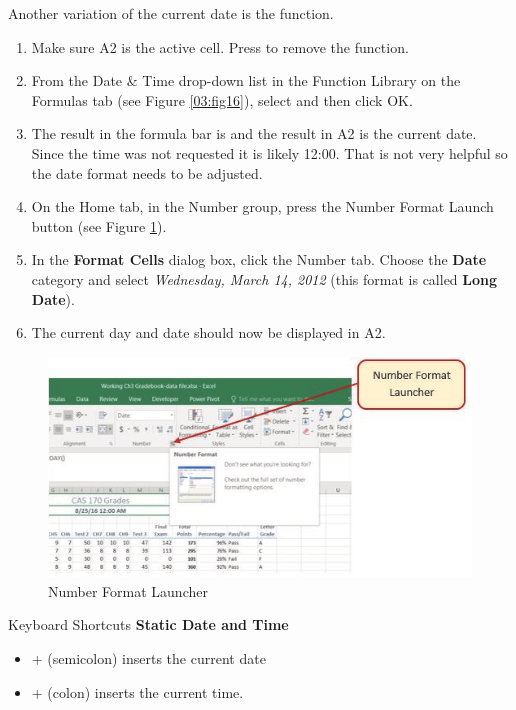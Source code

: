 Another variation of the current date is the  function.

\begin{enumerate}
	\item Make sure \textsf{A2} is the active cell. Press  to remove the  function.
	\item From the Date \& Time drop-down list in the Function Library on the Formulas tab (see Figure \ref{03:fig16}), select  and then click OK.
	\item The result in the formula bar is  and the result in \textsf{A2} is the current date. Since the time was not requested it is likely 12:00. That is not very helpful so the date format needs to be adjusted.
	\item On the Home tab, in the Number group, press the Number Format Launch button (see Figure \ref{03:fig17}).
	\item In the \textbf{Format Cells} dialog box, click the Number tab. Choose the \textbf{Date} category and select \textit{Wednesday, March 14, 2012} (this format is called \textbf{Long Date}).
	\item The current day and date should now be displayed in \textsf{A2}.
\end{enumerate}

\begin{figure}[H]
	\centering
	\includegraphics[width=\maxwidth{.95\linewidth}]{gfx/ch03_fig17}
	\caption{Number Format Launcher}
	\label{03:fig17}
\end{figure}

\begin{center}
	\begin{shtcutbox}{Keyboard Shortcuts}
		\textbf{Static Date and Time}
		\\
		\begin{itemize}
			\setlength{\itemsep}{0pt}
			\setlength{\parskip}{0pt}
			\setlength{\parsep}{0pt}

			\item {} + \keystroke{;} (semicolon) inserts the current date
			\item {} + \keystroke{:} (colon) inserts the current time.
			
		\end{itemize}
	\end{shtcutbox}
\end{center}


